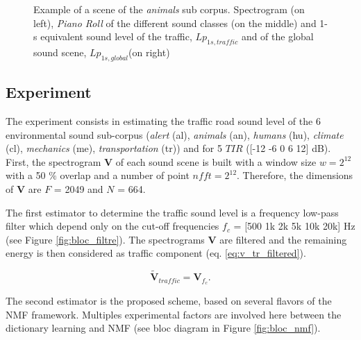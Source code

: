 \documentclass[twocolumn,a4paper,10pt]{article}
\begin{document}
\begin{figure}
\begin{minipage}[c]{.32\linewidth}
   \end{minipage}
\caption{Example of a scene of the \textit{animals} sub corpus. Spectrogram (on left), \textit{Piano Roll} of the different sound classes (on the middle) and 1-s equivalent sound level of the traffic, $Lp_{1s,traffic}$ and of the global sound scene, $Lp_{1s,global}$(on right)}
\label{fig:exampleScene}
\end{figure}

\subsection{Experiment}

The experiment consists in estimating the traffic road sound level of the 6 environmental sound sub-corpus (\textit{alert} (al), \textit{animals} (an), \textit{humans} (hu), \textit{climate} (cl), \textit{mechanics} (me), \textit{transportation} (tr)) and for 5 $TIR$ ([-12 -6 0 6 12] dB). First, the spectrogram $\mathbf{V}$ of each sound scene is built with a window size $w = 2^{12}$ with a 50 $\%$ overlap and a number of point $nfft = 2^{12}$. Therefore, the dimensions of $\mathbf{V}$ are $F$ = 2049 and $N$ = 664.

The first estimator to determine the traffic sound level is a frequency low-pass filter which depend only on the cut-off frequencies $f_c$ = [500 1k 2k 5k 10k 20k] Hz (see Figure \ref{fig:bloc_filtre}). The spectrograms $\mathbf{V}$ are filtered and the remaining energy is then considered as traffic component (eq. \ref{eq:v_tr_filtered}).

\begin{equation}\label{eq:v_tr_filtered}
\mathbf{\tilde{V}}_{traffic} = \mathbf{V}_{f_c}.
\end{equation}

The second estimator is the proposed scheme, based on several flavors of the NMF framework. Multiples experimental factors are involved here between the dictionary learning and NMF (see bloc diagram in Figure \ref{fig:bloc_nmf}).
\end{document}
